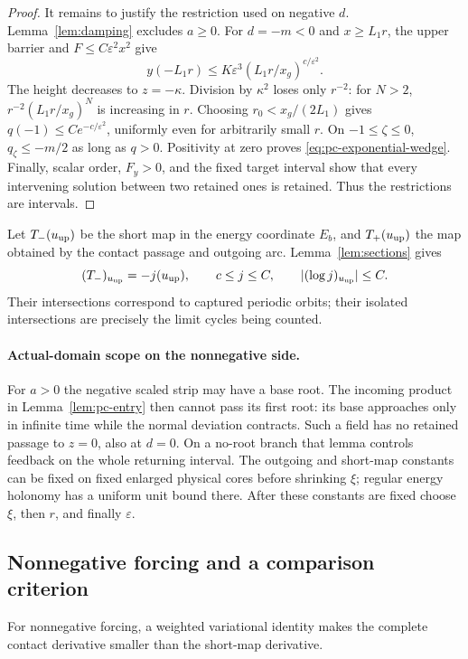 \begin{proof}
It remains to justify the restriction used on negative $d$.
Lemma~\ref{lem:damping} excludes $a\ge0$. For $d=-m<0$ and $x\ge L_1r$,
the upper barrier and $F\le C\varepsilon^2x^2$ give
\[
 y(-L_1r)\le K\varepsilon^3
       (L_1r/x_g)^{c/\varepsilon^2}.
\]
The height decreases to $z=-\kappa$. Division by $\kappa^2$ loses
only $r^{-2}$: for $N>2$, $r^{-2}(L_1r/x_g)^N$ is increasing in
$r$. Choosing $r_0<x_g/(2L_1)$ gives $q(-1)\le Ce^{-c/\varepsilon^2}$,
uniformly even for arbitrarily small $r$. On $-1\le\zeta\le0$,
$q_\zeta\le-m/2$ as long as $q>0$. Positivity at zero proves
\eqref{eq:pc-exponential-wedge}. Finally, scalar order, $F_y>0$,
and the fixed target interval show that every intervening solution
between two retained ones is retained. Thus the restrictions are
intervals.
\end{proof}

Let $T_-(u_{\rm up})$ be the short map in the energy coordinate $E_b$,
and $T_+(u_{\rm up})$ the map obtained by the contact passage and outgoing arc.
Lemma~\ref{lem:sections} gives
\begin{equation}
\label{eq:pc-short}
 (T_-)_{u_{\rm up}}=-j(u_{\rm up}),\qquad c\le j\le C,\qquad
 |(\log j)_{u_{\rm up}}|\le C.
\end{equation}
Their intersections correspond to captured periodic orbits; their isolated
intersections are precisely the limit cycles being counted.

\paragraph{Actual-domain scope on the nonnegative side.}
For $a>0$ the negative scaled strip may have a base root. The incoming
product in Lemma~\ref{lem:pc-entry} then cannot pass its first root:
its base approaches only in infinite time while the normal deviation
contracts. Such a field has no retained passage to $z=0$, also at
$d=0$. On a no-root branch that lemma controls feedback on the whole
returning interval.
The outgoing and short-map constants can be fixed on fixed
enlarged physical cores before shrinking $\xi$; regular energy
holonomy has a uniform unit bound there. After these constants
are fixed choose $\xi$, then $r$, and finally $\varepsilon$.

\subsection{Nonnegative forcing and a comparison criterion}

For nonnegative forcing, a weighted variational identity makes the
complete contact derivative smaller than the short-map derivative.

